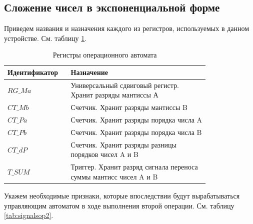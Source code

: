 \documentclass[a4paper,14pt]{extarticle}
\begin{document}
\subsection{Сложение чисел в экспоненциальной форме}
Приведем названия и назначения каждого из регистров, используемых в данном устройстве. См. таблицу \ref{tab:course_op2_regs}.
\begin{table}[h!]
	\centering
	\small
	\begin{tabular}{|m{0.2\linewidth}|m{0.6\linewidth}|}
		\hline
		\textbf{Идентификатор} & \textbf{Назначение} \\ \hline
		$RG\_Ma$ & Универсальный сдвиговый регистр. Хранит разряды мантиссы А\\ \hline
		$CT\_Mb$ & Счетчик. Хранит разряды мантиссы B\\ \hline
		$CT\_Pa$ & Счетчик. Хранит разряды порядка числа A \\\hline
		$CT\_Pb$ & Счетчик. Хранит разряды порядка числа B \\ \hline
		$CT\_dP$ & Счетчик. Хранит разряды разницы порядков чисел A и B\\ \hline
		$T\_SUM$& Триггер. Хранит разряд сигнала переноса суммы мантисс чисел A и B\\\hline
	\end{tabular}
	\caption{Регистры операционного автомата}
	\label{tab:course_op2_regs}
\end{table}

\normalsize
Укажем необходимые признаки, которые впоследствии будут вырабатываться управляющим автоматом в ходе выполнения второй операции. См. таблицу \ref{tab:signalsop2}.
\end{document}
